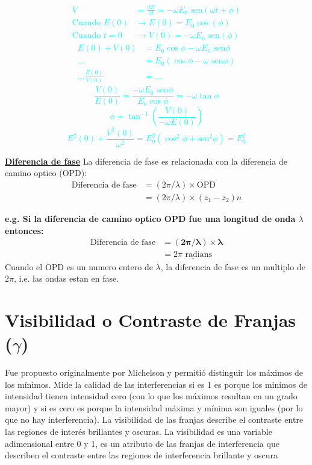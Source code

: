 \documentclass[12pt]{article}
\begin{document}
	\textcolor{cyan}{
		\begin{align*}
			V &= \frac{dE}{dt} = - \omega E_0 \text{ sen}(\omega t + \phi) \\
			\text{Cuando } E(0) &\rightarrow E(0) = E_0 \cos(\phi) \\
			\text{Cuando } t=0 &\rightarrow V(0) = - \omega E_0 \text{ sen}(\phi)
		\end{align*}
		\begin{align*}
			E(0) + V(0) &= E_0 \cos\phi - \omega E_0 \text{ sen}\phi \\
			... &= E_0(\cos\phi - \omega \text{ sen}\phi) \\
			... \frac{E(0)}{V(0)} &= ...
		\end{align*}
		\begin{equation*}
			\frac{V(0)}{E(0)} = \frac{- \omega E_0 \text{ sen}\phi}{E_0 \cos\phi} = - \omega \tan\phi
		\end{equation*}
		\begin{equation*}
			\phi = \tan^{-1}\left( \frac{V(0)}{-\omega E(0)} \right)
		\end{equation*}
		\begin{equation*}
			E^2(0) + \frac{V^2(0)}{\omega^2} = E_0^2 (\cos^2\phi + \text{sen}^2\phi) = E_0^2
		\end{equation*}
	}
	
	\underline{\textbf{Diferencia de fase}}
	La diferencia de fase es relacionada con la diferencia de camino optico (OPD):
	\begin{align*}
		\text{Diferencia de fase} &= (2\pi / \lambda) \times \text{OPD} \\
		&= (2\pi / \lambda) \times (z_1 - z_2)n
	\end{align*}
	
	\textbf{e.g. Si la diferencia de camino optico OPD fue una longitud de onda $\lambda$ entonces:}
	\begin{align*}
		\text{Diferencia de fase} &= \mathbf{(2\pi / \lambda) \times \lambda} \\
		&= \underline{2\pi \text{ radians}}
	\end{align*}
	Cuando el OPD es un numero entero de $\lambda$, la diferencia de fase es un multiplo de $2\pi$, i.e. las ondas estan en fase.
	
	\section{Visibilidad o Contraste de Franjas ($\gamma$)}
	Fue propuesto originalmente por Michelson y permitió distinguir los máximos de los mínimos. Mide la calidad de las interferencias si es 1 es porque los mínimos de intensidad tienen intensidad cero (con lo que los máximos resultan en un grado mayor) y si es cero es porque la intensidad máxima y mínima son iguales (por lo que no hay interferencia). La visibilidad de las franjas describe el contraste entre las regiones de interés brillantes y oscuras. La visibilidad es una variable adimensional entre 0 y 1, es un atributo de las franjas de interferencia que describen el contraste entre las regiones de interferencia brillante y oscura
	
\end{document}

